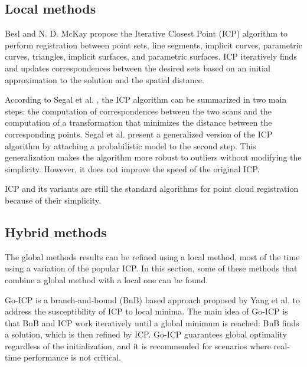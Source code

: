         \subsection{Local methods} 

        Besl and N. D. McKay \cite{Besl_1992_amethod} propose the Iterative Closest Point (ICP) algorithm to perform registration 
        between point sets, line segments, implicit curves, parametric curves, triangles, implicit surfaces, and parametric surfaces.
        ICP iteratively finds and updates correspondences between the desired sets based on an initial approximation to the solution and 
        the spatial distance.

        According to Segal et al. \cite{Segal_2009_generalizedicp}, the ICP algorithm can be summarized in two main steps:
        the computation of correspondences between the two scans and 
        the computation of a transformation that minimizes the distance between the corresponding points.
        Segal et al. present a generalized version of the ICP algorithm by attaching a probabilistic model to the second step.
        This generalization makes the algorithm more robust to outliers without modifying the simplicity. 
        However, it does not improve the speed of the original ICP.

        ICP and its variants are still the standard algorithms for point cloud registration because of their simplicity. 

        \subsection{Hybrid methods} 

        The global methods results can be refined using a local method, most of the time using a variation of the popular ICP. 
        In this section, some of these methods that combine a global method with a local one can be found.

        Go-ICP is a branch-and-bound (BnB) based approach proposed by Yang et al. \cite{Yang_2016_goicp} to address the susceptibility of ICP to local minima. 
        The main idea of Go-ICP is that BnB and ICP work iteratively until a global minimum is reached: BnB finds a solution, which is then refined by ICP.
        Go-ICP guarantees global optimality regardless of the initialization, and it is recommended for scenarios where real-time performance is not critical.

